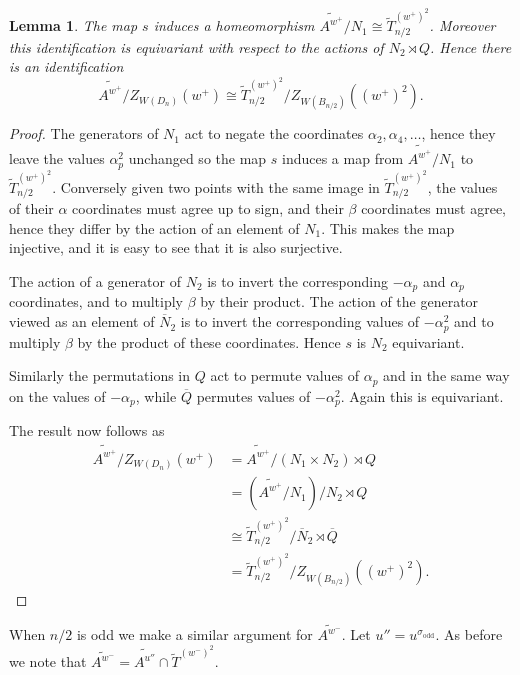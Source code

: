 \documentclass[11pt,a4paper]{article}
\newtheorem{lemma}[theorem]{Lemma}
\def\coveringtorus{\tilde{T}}
\def\odd{\mathrm{odd}}
\def\TSpinn{\coveringtorus_{n/2}}
\def\wplus{w^+}
\def\wminus{w^-}
\begin{document}
\begin{lemma}\label{lemma1}
The map $s$ induces a homeomorphism $\widetilde{A^{\wplus}}/N_1 \cong \TSpinn^{(\wplus)^2}$\!\!. 
Moreover this identification is equivariant with respect to the actions of $N_2\rtimes Q$. Hence there is an identification 
\[
\widetilde{A^{\wplus}}/Z_{W(D_n)}(\wplus) \cong \TSpinn
    ^{(\wplus)^2}/Z_{W(B_{n/2})}((\wplus)^2).
    \]
\end{lemma}

\begin{proof}
The generators of $N_1$ act to negate the coordinates $\alpha_2,\alpha_4,\dots$, hence they leave the values $\alpha_p^2$ unchanged so the map $s$ induces a map from $\widetilde{A^{\wplus}}/N_1$ to $\TSpinn^{(\wplus)^2}$.  Conversely given two points with the same image in $\TSpinn^{(\wplus)^2}$, the values of their $\alpha$ coordinates must agree up to sign, and their $\beta$ coordinates must agree, hence they differ by the action of an element of $N_1$.  This makes the map injective, and it is easy to see that it is also surjective.

The action of a generator of $N_2$ is to invert the corresponding $-\alpha_p$ and $\alpha_p$ coordinates, and to multiply $\beta$ by their product.  The action of the generator viewed as an element of $\overline{N}_2$ is to invert the corresponding values of $-\alpha_p^2$ and to multiply $\beta$ by the product of these coordinates.  Hence $s$ is $N_2$ equivariant.

Similarly the permutations in $Q$ act to permute values of $\alpha_p$ and in the same way on the values of $-\alpha_p$, while $\overline{Q}$ permutes values of $-\alpha_p^2$.  Again this is equivariant.

The result now follows as
\begin{align*}
\widetilde{A^{\wplus}}/Z_{W(D_n)}(\wplus) &= \widetilde{A^{\wplus}}/(N_1\times N_2)\rtimes Q\\
&=(\widetilde{A^{\wplus}}/N_1) /N_2\rtimes Q\\
&\cong \TSpinn
    ^{(\wplus)^2} / \overline{N}_2\rtimes \overline{Q}\\
    &= \TSpinn
    ^{(\wplus)^2} /Z_{W(B_{n/2})}((\wplus)^2).
\end{align*}
\end{proof}

When $n/2$ is odd we make a similar argument for $\widetilde{A^{\wminus}}$.  Let $u''=u^{\sigma_\odd}$. As before we note that $\widetilde{A^{\wminus}}=\widetilde{A^{u''}} \cap \coveringtorus^{(\wminus)^2}$.
\end{document}
